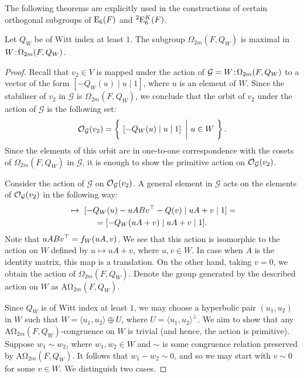 The following theorems are explicitly used in the constructions of certain orthogonal subgroups
of $\mathord{\mathrm{E}}_6(F)$ and ${}^2\mathord{\mathrm{E}}_6^K(F)$. 

\begin{theorem}
	\label{theorem:A_omega_maximal}
	Let $Q_W$ be of Witt index at least $1$. The subgroup $\Omega_{2m}(F,Q_W)$ is maximal
	in $W\mathord{{\;\!{:}\;\!}}\Omega_{2m}(F,Q_W)$.
\end{theorem}

\begin{proof}
	Recall that $v_2 \in V$ is mapped under the action of 
    $\mathcal{G} = W\mathord{{\;\!{:}\;\!}}\Omega_{2m}(F,Q_W)$ to a vector of the
    form $[-Q_W(u) \mid u \mid 1]$, where $u$ is an element of $W$. 
    Since the stabiliser of $v_2$ in $\mathcal{G}$ is $\Omega_{2m}(F,Q_W)$, 
    we conclude that 
    the orbit of $v_2$ under the action of $\mathcal{G}$ is the following set:
    \begin{equation*}
	\operatorname{\mathcal{O}}_{\mathcal{G}}(v_2) = \left\{\  \left[ -Q_W(u) \mid  u \mid 1
	 \right]\ \bigg|\ u \in W \ \right\}.
    \end{equation*}
    Since the elements of this orbit are in one-to-one correspondence with the
    cosets of $\Omega_{2m}(F,Q_W)$ in $\mathcal{G}$, 
    it is enough to show the primitive
    action on $\operatorname{\mathcal{O}}_{\mathcal{G}}(v_2)$. 
    
    Consider the action of $\mathcal{G}$ on 
    $\operatorname{\mathcal{O}}_{\mathcal{G}}(v_2)$. A general element in $\mathcal{G}$ 
    acts on the elements of $\operatorname{\mathcal{O}}_{\mathcal{G}}(v_2)$ in the following way:
    \begin{multline*}
	[ -Q_W(u) \mid  u \mid 1 ] \ \mapsto \ 
	[ -Q_W(u) - uABv^\T - Q(v) \mid
	    uA + v \mid 1] = \\
	    = [-Q_W(uA + v) \mid uA + v \mid 1].
    \end{multline*}
    Note that $uABv^\top = f_W( uA, v )$. 
    We see that this action is isomorphic to the action on $W$ defined by
	$u \mapsto uA + v$,
    where $u,v \in W$. In case when $A$ is the identity matrix, this map
    is a translation. On the other hand, taking $v = 0$, we obtain the
    action of $\Omega_{2m}(F,Q_W)$. 
    Denote the group generated by the described action on $W$ as
    $\mathrm{A\Omega}_{2m}(F,Q_W)$.
    
    Since $Q_W$ is of Witt index at least $1$, we may choose a hyperbolic pair 
    $(u_1,u_2)$ in $W$ such that $W = \langle u_1, u_2 \rangle \oplus U$, where 
    $U = \langle u_1, u_2 \rangle^{\perp}$. We aim to show that any 
    $\mathrm{A\Omega}_{2m}(F,Q_W)$-congruence on $W$ is trivial (and hence, the 
    action is primitive). Suppose $w_1 \sim w_2$, where $w_1,w_2 \in W$ and 
    $\sim$ is some congruence relation preserved by $\mathrm{A\Omega}_{2m}(F,Q_W)$.
    It follows that $w_1 - w_2 \sim 0$, and so we may start with $v \sim 0$ for some
    $v \in W$. We distinguish two cases.
    

\end{proof}
